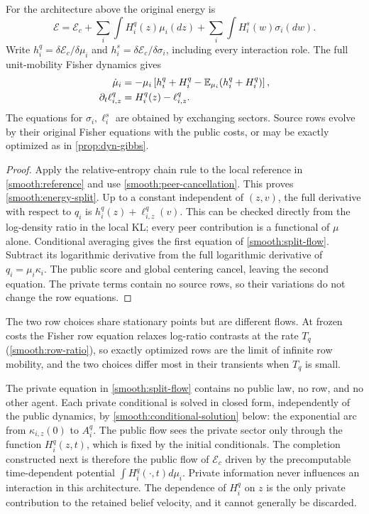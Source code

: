 For the architecture above the original energy is
\begin{equation}
 \mathcal E=\mathcal E_c+
 \sum_i\int H_i^q(z)\mu_i(dz)+
 \sum_i\int H_i^s(w)\sigma_i(dw).
 \label{smooth:energy-split}
\end{equation}
Write $h_i^q=\delta\mathcal E_c/\delta\mu_i$ and $h_i^s=\delta\mathcal E_c/\delta\sigma_i$, including every interaction role. The full unit-mobility Fisher dynamics gives
\begin{equation}
 \begin{aligned}
 \dot\mu_i&=-\mu_i\left[h_i^q+H_i^q-
                  \mathbb E_{\mu_i}(h_i^q+H_i^q)\right],\\
 \partial_t\ell_{i,z}^q&=H_i^q(z)-\ell_{i,z}^q.
 \end{aligned}
 \label{smooth:split-flow}
\end{equation}
The equations for $\sigma_i,\ell_i^s$ are obtained by exchanging sectors. Source rows evolve by their original Fisher equations with the public costs, or may be exactly optimized as in \cref{prop:dyn-gibbs}.
\begin{proof}
Apply the relative-entropy chain rule to the local reference in \cref{smooth:reference} and use \cref{smooth:peer-cancellation}. This proves \cref{smooth:energy-split}. Up to a constant independent of $(z,v)$, the full derivative with respect to $q_i$ is $h_i^q(z)+\ell_{i,z}^q(v)$. This can be checked directly from the log-density ratio in the local KL; every peer contribution is a functional of $\mu$ alone. Conditional averaging gives the first equation of \cref{smooth:split-flow}. Subtract its logarithmic derivative from the full logarithmic derivative of $q_i=\mu_i\kappa_i$. The public score and global centering cancel, leaving the second equation. The private terms contain no source rows, so their variations do not change the row equations.
\end{proof}

The two row choices share stationary points but are different flows. At frozen costs the Fisher row equation relaxes log-ratio contrasts at the rate $T_q$ (\cref{smooth:row-ratio}), so exactly optimized rows are the limit of infinite row mobility, and the two choices differ most in their transients when $T_q$ is small.

The private equation in \cref{smooth:split-flow} contains no public law, no row, and no other agent. Each private conditional is solved in closed form, independently of the public dynamics, by \cref{smooth:conditional-solution} below: the exponential arc from $\kappa_{i,z}(0)$ to $A_i^q$. The public flow sees the private sector only through the function $H_i^q(z,t)$, which is fixed by the initial conditionals. The completion constructed next is therefore the public flow of $\mathcal E_c$ driven by the precomputable time-dependent potential $\int H_i^q(\cdot,t)d\mu_i$. Private information never influences an interaction in this architecture. The dependence of $H_i^q$ on $z$ is the only private contribution to the retained belief velocity, and it cannot generally be discarded.

